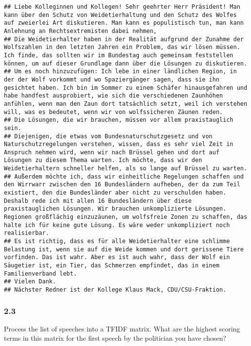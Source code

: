 \documentclass[
]{article}
\begin{document}
\begin{verbatim}
## Liebe Kolleginnen und Kollegen! Sehr geehrter Herr Präsident! Man kann über den Schutz von Weidetierhaltung und den Schutz des Wolfes auf zweierlei Art diskutieren. Man kann es populistisch tun, man kann Anlehnung an Rechtsextremisten dabei nehmen,
## Die Weidetierhalter haben in der Realität aufgrund der Zunahme der Wolfszahlen in den letzten Jahren ein Problem, das wir lösen müssen. Ich finde, das sollten wir im Bundestag auch gemeinsam feststellen können, um auf dieser Grundlage dann über die Lösungen zu diskutieren.
## Um es noch hinzuzufügen: Ich lebe in einer ländlichen Region, in der der Wolf vorkommt und wo Spaziergänger sagen, dass sie ihn gesichtet haben. Ich bin im Sommer zu einem Schäfer hinausgefahren und habe handfest ausprobiert, wie sich die verschiedenen Zaunhöhen anfühlen, wenn man den Zaun dort tatsächlich setzt, weil ich verstehen will, was es bedeutet, wenn wir von wolfssicheren Zäunen reden.
## Die Lösungen, die wir brauchen, müssen vor allem praxistauglich sein.
## Diejenigen, die etwas vom Bundesnaturschutzgesetz und von Naturschutzregelungen verstehen, wissen, dass es sehr viel Zeit in Anspruch nehmen wird, wenn wir nach Brüssel gehen und dort auf Lösungen zu diesem Thema warten. Ich möchte, dass wir den Weidetierhaltern schneller helfen, als so lange auf Brüssel zu warten.
## Außerdem möchte ich, dass wir einheitliche Regelungen schaffen und den Wirrwarr zwischen den 16 Bundesländern aufheben, der da zum Teil existiert, den die Bundesländer aber nicht zu verschulden haben. Deshalb rede ich mit allen 16 Bundesländern über diese praxistauglichen Lösungen. Wir brauchen unkomplizierte Lösungen. Regionen großflächig einzuzäunen, um wolfsfreie Zonen zu schaffen, das halte ich für keine gute Lösung. Es wäre weder unkompliziert noch realisierbar.
## Es ist richtig, dass es für alle Weidetierhalter eine schlimme Belastung ist, wenn sie auf die Weide kommen und dort gerissene Tiere vorfinden. Das ist wahr. Aber es ist auch wahr, dass der Wolf ein Säugetier ist, ein Tier, das Schmerzen empfindet, das in einem Familienverband lebt.
## Vielen Dank.
## Nächster Redner ist der Kollege Klaus Mack, CDU/CSU-Fraktion.
\end{verbatim}

\hypertarget{section-5}{%
\subsubsection{2.3}\label{section-5}}

Process the list of speeches into a TFIDF matrix. What are the highest
scoring terms in this matrix for the first speech by the politician you
have chosen?
\end{document}
